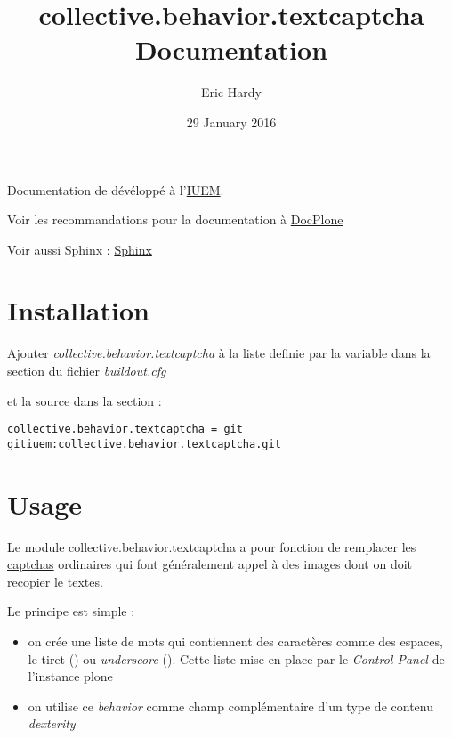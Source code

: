 \documentclass[letterpaper,10pt,french]{sphinxmanual}
\title{collective.behavior.textcaptcha Documentation}
\date{29 January 2016}
\author{Eric Hardy}
\begin{document}
\maketitle
\tableofcontents
{}\label{index::doc}


Documentation de  dévéloppé à l'\href{http://www-iuem.univ-brest.fr}{IUEM}.

Voir les recommandations pour la documentation à \href{http://docs.plone.org/about/documentation\_styleguide\_addons.html}{DocPlone}

Voir aussi Sphinx : \href{http://sphinx-doc.org/}{Sphinx}


\chapter{Installation}
\label{index:installation}\label{index:documentation-de-collective-behavior-textcaptcha}
Ajouter \emph{collective.behavior.textcaptcha} à la liste definie par la variable  dans la
section \code{{[}instance{]}} du fichier \emph{buildout.cfg}

et la source dans la section \code{{[}sources{]}}:

\begin{Verbatim}[commandchars=\\\{\}]
collective.behavior.textcaptcha = git gitiuem:collective.behavior.textcaptcha.git
\end{Verbatim}


\chapter{Usage}
\label{index:usage}
Le module collective.behavior.textcaptcha a pour fonction de remplacer les \href{https://fr.wikipedia.org/wiki/CAPTCHA}{captchas}
ordinaires qui font généralement appel à des images dont on doit recopier le textes.

Le principe est simple :
\begin{itemize}
\item {} 
on crée une liste de mots qui contiennent des caractères comme des espaces, le tiret (\code{-})
ou \emph{underscore} (\code{\_}). Cette liste mise en place par le \emph{Control Panel} de l'instance plone

\item {} 
on utilise ce \emph{behavior} comme champ complémentaire d'un type de contenu \emph{dexterity}

\end{itemize}
\end{document}
